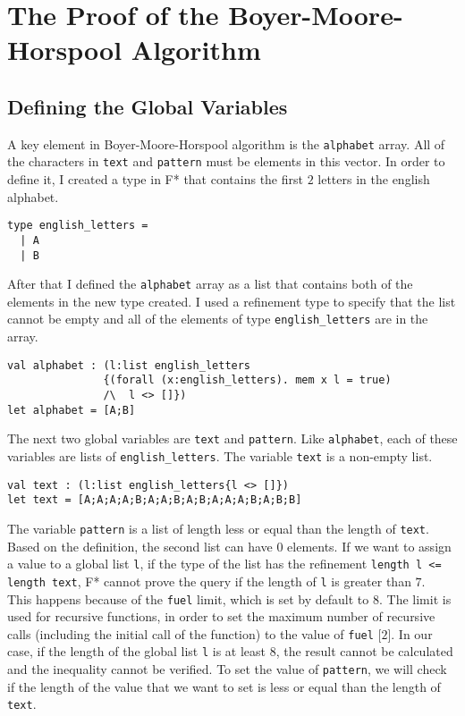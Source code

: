 \chapter{The Proof of the Boyer-Moore-Horspool Algorithm}

\section{Defining the Global Variables}

A key element in Boyer-Moore-Horspool algorithm is the \texttt{alphabet} array. All of the characters in \texttt{text} and \texttt{pattern} must be elements in this vector. In order to define it, I created a type in F* that contains the first \(2\) letters in the english alphabet.

\begin{verbatim}
type english_letters = 
  | A
  | B
\end{verbatim}

After that I defined the \texttt{alphabet} array as a list that contains both of the elements in the new type created. I used a refinement type to specify that the list cannot be empty and all of the elements of type \texttt{english\_letters} are in the array.

\begin{verbatim}
val alphabet : (l:list english_letters
               {(forall (x:english_letters). mem x l = true) 
               /\  l <> []}) 
let alphabet = [A;B]
\end{verbatim}

The next two global variables are \texttt{text} and \texttt{pattern}. Like \texttt{alphabet}, each of these variables are lists of \texttt{english\_letters}. The variable \texttt{text} is a non-empty list.

\begin{verbatim}
val text : (l:list english_letters{l <> []})
let text = [A;A;A;A;B;A;A;B;A;B;A;A;A;B;A;B;B]
\end{verbatim}

The variable \texttt{pattern} is a list of length less or equal than the length of \texttt{text}. Based on the definition, the second list can have \(0\) elements. If we want to assign a value to a global list \texttt{l}, if the type of the list has the refinement \texttt{length l <= length text}, F* cannot prove the query if the length of \texttt{l} is greater than \(7\). \\
\indent This happens because of the \texttt{fuel} limit, which is set by default to \(8\). The limit is used for recursive functions, in order to set the maximum number of recursive calls (including the initial call of the function) to the value of \texttt{fuel} [\(2\)]. In our case, if the length of the global list \texttt{l} is at least \(8\), the result cannot be calculated and the inequality cannot be verified. To set the value of \texttt{pattern}, we will check if the length of the value that we want to set is less or equal than the length of \texttt{text}.


